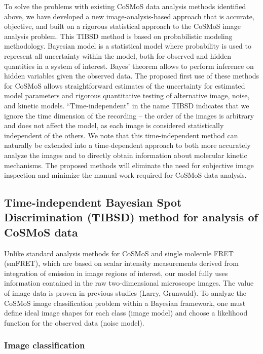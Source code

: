 To solve the problems with existing CoSMoS data analysis methods identified above, we have developed a new image-analysis-based approach that is accurate, objective, and built on a rigorous statistical approach to the CoSMoS image analysis problem. This TIBSD method is based on probabilistic modeling methodology. Bayesian model is a statistical model where probability is used to represent all uncertainty within the model, both for observed and hidden quantities in a system of interest. Bayes' theorem allows to perform inference on hidden variables given the observed data. The proposed first use of these methods for CoSMoS allows straightforward estimates of the uncertainty for estimated model parameters and rigorous quantitative testing of alternative image, noise, and kinetic models. “Time-independent” in the name TIBSD indicates that we ignore the time dimension of the recording -- the order of the images is arbitrary and does not affect the model, as each image is considered statistically independent of the others. We note that this time-independent method can naturally be extended into a time-dependent approach to both more accurately analyze the images and to directly obtain information about molecular kinetic mechanisms.  The proposed methods will eliminate the need for subjective image inspection and minimize the manual work required for CoSMoS data analysis.

\subsection{Time-independent Bayesian Spot Discrimination (TIBSD) method for analysis of CoSMoS data}

Unlike standard analysis methods for CoSMoS and single molecule FRET (smFRET), which are based on scalar intensity measurements derived from integration of emission in image regions of interest, our model fully uses information contained in the raw two-dimensional microscope images. The value of image data is proven in previous studies (Larry, Grunwald). To analyze the CoSMoS image classification problem within a Bayesian framework, one must define ideal image shapes for each class (image model) and choose a likelihood function for the observed data (noise model).

\subsubsection{Image classification}

